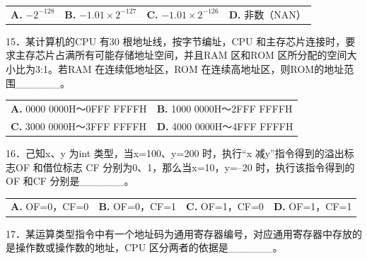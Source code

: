 \documentclass[UTF8,11pt]{ctexart}
\begin{document}
\begin{center}\begin{tabular}{>{\raggedright\arraybackslash}p{\dimexpr(\linewidth-8\tabcolsep)/4\relax}>{\raggedright\arraybackslash}p{\dimexpr(\linewidth-8\tabcolsep)/4\relax}>{\raggedright\arraybackslash}p{\dimexpr(\linewidth-8\tabcolsep)/4\relax}>{\raggedright\arraybackslash}p{\dimexpr(\linewidth-8\tabcolsep)/4\relax}}
\textbf{A.} \(\displaystyle -2^{-128}\) & \textbf{B.} \(\displaystyle -1.01\times2^{-127}\) & \textbf{C.} \(\displaystyle -1.01\times2^{-126}\) & \textbf{D.} 非数（NAN）\\[.35em]\end{tabular}\end{center}

15．某计算机的CPU 有30 根地址线，按字节编址，CPU 和主存芯片连接时，要求主存芯片占满所有可能存储地址空间，并且RAM 区和ROM 区所分配的空间大小比为3:1。若RAM 在连续低地址区，ROM 在连续高地址区，则ROM的地址范围\_\_\_\_\_\_。


\begin{center}\begin{tabular}{>{\raggedright\arraybackslash}p{\dimexpr(\linewidth-4\tabcolsep)/2\relax}>{\raggedright\arraybackslash}p{\dimexpr(\linewidth-4\tabcolsep)/2\relax}}
\textbf{A.} 0000 0000H～0FFF FFFFH & \textbf{B.} 1000 0000H～2FFF FFFFH\\[.35em]
\textbf{C.} 3000 0000H～3FFF FFFFH & \textbf{D.} 4000 0000H～4FFF FFFFH\\[.35em]\end{tabular}\end{center}

16．己知x、y 为int 类型，当x=100、y=200 时，执行“x 减y”指令得到的溢出标志OF 和借位标志 CF 分别为0、1，那么当x=10，y=–20 时，执行该指令得到的OF 和CF 分别是\_\_\_\_\_\_。


\begin{center}\begin{tabular}{>{\raggedright\arraybackslash}p{\dimexpr(\linewidth-8\tabcolsep)/4\relax}>{\raggedright\arraybackslash}p{\dimexpr(\linewidth-8\tabcolsep)/4\relax}>{\raggedright\arraybackslash}p{\dimexpr(\linewidth-8\tabcolsep)/4\relax}>{\raggedright\arraybackslash}p{\dimexpr(\linewidth-8\tabcolsep)/4\relax}}
\textbf{A.} OF=0，CF=0 & \textbf{B.} OF=0，CF=1 & \textbf{C.} OF=1，CF=0 & \textbf{D.} OF=1，CF=1\\[.35em]\end{tabular}\end{center}

17．某运算类型指令中有一个地址码为通用寄存器编号，对应通用寄存器中存放的是操作数或操作数的地址，CPU 区分两者的依据是\_\_\_\_\_\_。
\end{document}
